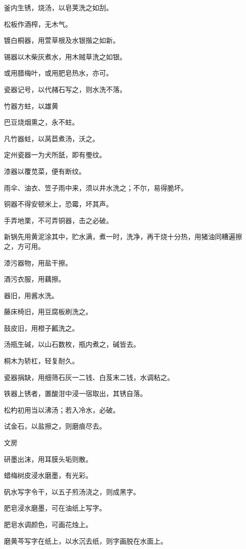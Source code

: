 \documentclass[a4paper,12pt,UTF8,twoside]{ctexbook}
\begin{document}
    釜内生锈，烧汤，以皂荚洗之如刮。
    
    松板作酒榨，无木气。
    
    镀白桐器，用萱草根及水银揩之如新。
    
    锡器以木柴灰煮水，用木贼草洗之如银。
    
    或用腊梅叶，或用肥皂热水，亦可。
    
    瓷器记号，以代赭石写之，则水洗不落。
    
    竹器方蛀，以雄黄
    
    巴豆烧烟熏之，永不蛀。
    
    凡竹器蛀，以莴苣煮汤，沃之。
    
    定州瓷器一为犬所舐，即有璺纹。
    
    漆器以覆苋菜，便有断纹。
    
    雨伞、油衣、笠子雨中来，须以井水洗之；不尔，易得脆坏。
    
    铜器不得安顿米上，恐霉，坏其声。
    
    手弄地栗，不可弄铜器，击之必破。
    
    新锅先用黄泥涂其中，贮水满，煮一时，洗净，再干烧十分热，用猪油同糟遍擦之，方可用。
    
    漆污器物，用盐干擦。
    
    酒污衣服，用藕擦。
    
    器旧，用酱水洗。
    
    藤床椅旧，用豆腐板刷洗之。
    
    鼓皮旧，用橙子瓤洗之。
    
    汤瓶生碱，以山石数枚，瓶内煮之，碱皆去。
    
    桐木为轿杠，轻复耐久。
    
    瓷器捐缺，用细筛石灰一二钱、白芨末二钱，水调粘之。
    
    铁器上锈者，置酸泔中浸一宿取出，其锈自落。
    
    松杓初用当以沸汤；若入冷水，必破。
    
    试金石，以盐擦之，则磨痕尽去。
    
    文房
    
    研墨出沫，用耳膜头垢则散。
    
    蜡梅树皮浸水磨墨，有光彩。
    
    矾水写字令干，以五子煎汤浇之，则成黑字。
    
    肥皂浸水磨墨，可在油纸上写字。
    
    肥皂水调颜色，可画花烛上。
    
    磨黄芩写字在纸上，以水沉去纸，则字画脱在水面上。
    
\end{document}
